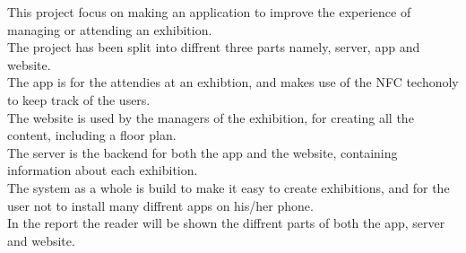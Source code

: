 This project focus on making an application to improve the experience of managing or attending an exhibition.\\
The project has been split into diffrent three parts namely, server, app and website.\\
The app is for the attendies at an exhibtion, and makes use of the NFC techonoly to keep track of the users.\\
The website is used by the managers of the exhibition, for creating all the content, including a floor plan.\\
The server is the backend for both the app and the website, containing information about each exhibition.\\
The system as a whole is build to make it easy to create exhibitions, and for the user not to install many diffrent apps on his/her phone.\\
In the report the reader will be shown the diffrent parts of both the app, server and website.
